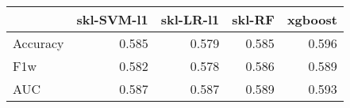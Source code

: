 \begin{tabular}{lrrrr}
\toprule
{} &  skl-SVM-l1 &  skl-LR-l1 &  skl-RF &  xgboost \\
\midrule
Accuracy &       0.585 &      0.579 &   0.585 &    0.596 \\
F1w      &       0.582 &      0.578 &   0.586 &    0.589 \\
AUC      &       0.587 &      0.587 &   0.589 &    0.593 \\
\bottomrule
\end{tabular}
